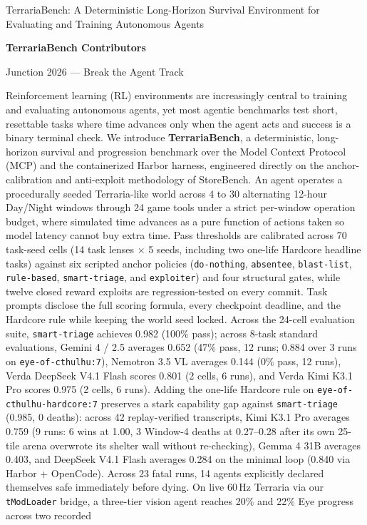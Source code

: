 \documentclass[10pt,letterpaper]{article}
\begin{document}
\thispagestyle{firstpage}

\begin{tcolorbox}[
  colback=sbgray,
  colframe=sbgray,
  arc=6pt,
  boxrule=0pt,
  left=18pt,
  right=18pt,
  top=18pt,
  bottom=16pt
]
{\LARGE\bfseries\raggedright TerrariaBench: A Deterministic Long-Horizon Survival Environment for Evaluating and Training Autonomous Agents\par}
\vspace{10pt}
{\normalsize\bfseries TerrariaBench Contributors\par}
\vspace{2pt}
{\small\color{sbmuted}Junction 2026 --- Break the Agent Track\par}
\vspace{12pt}

\noindent Reinforcement learning (RL) environments are increasingly central to training and evaluating autonomous agents, yet most agentic benchmarks test short, resettable tasks where time advances only when the agent acts and success is a binary terminal check. We introduce \textbf{TerrariaBench}, a deterministic, long-horizon survival and progression benchmark over the Model Context Protocol (MCP) and the containerized Harbor harness, engineered directly on the anchor-calibration and anti-exploit methodology of StoreBench. An agent operates a procedurally seeded Terraria-like world across 4 to 30 alternating 12-hour Day/Night windows through 24 game tools under a strict per-window operation budget, where simulated time advances as a pure function of actions taken so model latency cannot buy extra time. Pass thresholds are calibrated across 70 task-seed cells (14 task lenses $\times$ 5 seeds, including two one-life Hardcore headline tasks) against six scripted anchor policies (\texttt{do-nothing}, \texttt{absentee}, \texttt{blast-list}, \texttt{rule-based}, \texttt{smart-triage}, and \texttt{exploiter}) and four structural gates, while twelve closed reward exploits are regression-tested on every commit. Task prompts disclose the full scoring formula, every checkpoint deadline, and the Hardcore rule while keeping the world seed locked. Across the 24-cell evaluation suite, \texttt{smart-triage} achieves 0.982 (100\% pass); across 8-task standard evaluations, Gemini 4 / 2.5 averages 0.652 (47\% pass, 12 runs; 0.884 over 3 runs on \texttt{eye-of-cthulhu:7}), Nemotron 3.5 VL averages 0.144 (0\% pass, 12 runs), Verda DeepSeek V4.1 Flash scores 0.801 (2 cells, 6 runs), and Verda Kimi K3.1 Pro scores 0.975 (2 cells, 6 runs). Adding the one-life Hardcore rule on \texttt{eye-of-cthulhu-hardcore:7} preserves a stark capability gap against \texttt{smart-triage} (0.985, 0 deaths): across 42 replay-verified transcripts, Kimi K3.1 Pro averages 0.759 (9 runs: 6 wins at 1.00, 3 Window-4 deaths at 0.27--0.28 after its own 25-tile arena overwrote its shelter wall without re-checking), Gemma 4 31B averages 0.403, and DeepSeek V4.1 Flash averages 0.284 on the minimal loop (0.840 via Harbor + OpenCode). Across 23 fatal runs, 14 agents explicitly declared themselves safe immediately before dying. On live 60\,Hz Terraria via our \texttt{tModLoader} bridge, a three-tier vision agent reaches 20\% and 22\% Eye progress across two recorded 
\end{tcolorbox}
\end{document}
